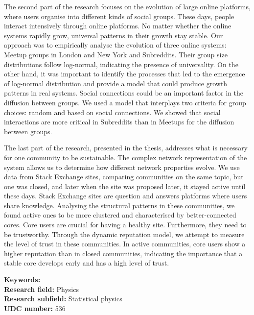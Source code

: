 The second part of the research focuses on the evolution of large online platforms, where users organise into different kinds of social groups. These days, people interact intensively through online platforms. No matter whether the online systems rapidly grow, universal patterns in their growth stay stable. Our approach was to empirically analyse the evolution of three online systems: Meetup groups in London and New York and Subreddits. Their group size distributions follow log-normal, indicating the presence of universality.
On the other hand, it was important to identify the processes that led to the emergence of log-normal distribution and provide a model that could produce growth patterns in real systems. Social connections could be an important factor in the diffusion between groups. We used a model that interplays two criteria for group choices: random and based on social connections. We showed that social interactions are more critical in Subreddits than in Meetups for the diffusion between groups. 

The last part of the research, presented in the thesis, addresses what is necessary for one community to be sustainable. The complex network representation of the system allows us to determine how different network properties evolve. We use data from Stack Exchange sites, comparing communities on the same topic, but one was closed, and later when the site was proposed later, it stayed active until these days. Stack Exchange sites are question and answers platforms where users share knowledge. Analysing the structural patterns in these communities, we found active ones to be more clustered and characterised by better-connected cores. Core users are crucial for having a healthy site. Furthermore, they need to be trustworthy. Through the dynamic reputation model, we attempt to measure the level of trust in these communities. In active communities, core users show a higher reputation than in closed communities, indicating the importance that a stable core develops early and has a high level of trust.

\noindent
{\textbf {Keywords:}} \\ %
{\textbf {Research field:}} Physics \\
{\textbf {Research subfield:}} Statistical physics\\
\textbf{UDC number:} 536 %

\hfill

\justify
